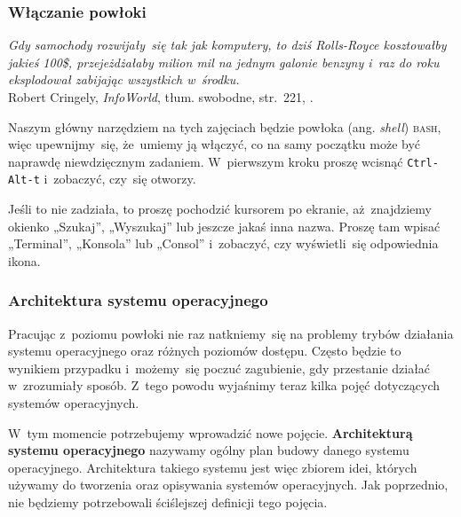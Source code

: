 \documentclass[10pt,t]{beamer}
\begin{document}
\begin{frame}
  \frametitle{Włączanie powłoki}


  \textit{Gdy samochody rozwijały~się tak jak komputery, to dziś
    Rolls-Royce kosztowałby jakieś 100\$, przejeżdżałaby milion mil na
    jednym galonie benzyny i~raz do roku eksplodował zabijając wszystkich
    w~środku.} \\
  Robert Cringely, \textit{InfoWorld}, tłum. swobodne, str.~221,
  \parencite{Garfinkel-Weise-Strassmann-The-UNIX-HATERS-Handbook-Pub-1994}.


  Naszym główny narzędziem na tych zajęciach będzie powłoka
  (ang. \textit{shell}) \textsc{bash}, więc upewnijmy~się, że~umiemy ją
  włączyć, co na samy początku może być naprawdę niewdzięcznym zadaniem.
  W~pierwszym kroku proszę wcisnąć \texttt{Ctrl-Alt-t} i~zobaczyć, czy~się
  otworzy.

  Jeśli to nie zadziała, to proszę pochodzić kursorem po ekranie,
  aż~znajdziemy okienko „Szukaj”, „Wyszukaj” lub jeszcze jakaś inna nazwa.
  Proszę tam wpisać „Terminal”, „Konsola” lub „Consol” i~zobaczyć, czy
  wyświetli~się odpowiednia ikona.


\end{frame}





\begin{frame}
  \frametitle{Architektura systemu operacyjnego}


  Pracując z~poziomu powłoki nie raz natkniemy~się na problemy
  trybów działania systemu operacyjnego oraz różnych poziomów dostępu.
  Często będzie to wynikiem przypadku i~możemy~się poczuć zagubienie,
  gdy przestanie działać w~zrozumiały sposób. Z~tego powodu wyjaśnimy teraz
  kilka pojęć dotyczących systemów operacyjnych.

  W~tym momencie potrzebujemy wprowadzić nowe pojęcie.
  \textbf{Architekturą systemu operacyjnego} nazywamy ogólny plan budowy
  danego systemu operacyjnego. Architektura takiego systemu jest więc
  zbiorem idei, których używamy do tworzenia oraz opisywania systemów
  operacyjnych. Jak poprzednio, nie będziemy potrzebowali ściślejszej
  definicji tego pojęcia.

\end{frame}
\end{document}
